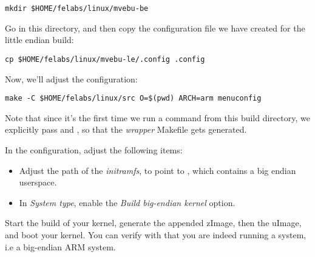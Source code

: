 \begin{verbatim}
mkdir $HOME/felabs/linux/mvebu-be
\end{verbatim}

Go in this directory, and then copy the configuration file we have
created for the little endian build:

\begin{verbatim}
cp $HOME/felabs/linux/mvebu-le/.config .config
\end{verbatim}

Now, we'll adjust the configuration:

\begin{verbatim}
make -C $HOME/felabs/linux/src O=$(pwd) ARCH=arm menuconfig
\end{verbatim}

Note that since it's the first time we run a  command from
this build directory, we explicitly pass  and , so
that the {\em wrapper} Makefile gets generated.

In the configuration, adjust the following items:

\begin{itemize}
\item Adjust the path of the {\em initramfs}, to point to
  , which
  contains a big endian userspace.
\item In {\em System type}, enable the {\em Build big-endian kernel}
  option.
\end{itemize}

Start the build of your kernel, generate the appended zImage, then the
uImage, and boot your kernel. You can verify with  that
you are indeed running a  system, i.e a big-endian ARM
system.

